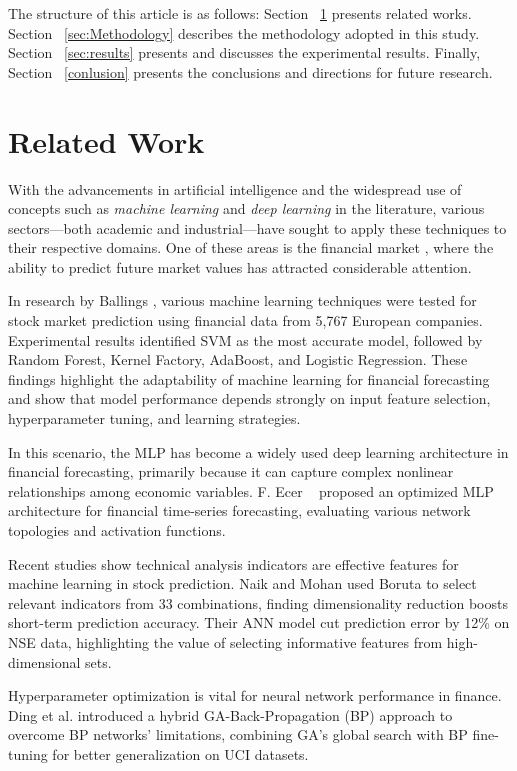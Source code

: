 \documentclass[conference]{IEEEtran}
\begin{document}
The structure of this article is as follows: Section ~\ref{sec:relatedwork} presents related works. Section ~\ref{sec:Methodology} describes the methodology adopted in this study. Section ~\ref{sec:results} presents and discusses the experimental results. Finally, Section ~\ref{conlusion} presents the conclusions and directions for future research.


\section{Related Work}
\label{sec:relatedwork}
With the advancements in artificial intelligence and the widespread use of concepts such as \textit{machine learning} and \textit{deep learning} in the literature, various sectors—both academic and industrial—have sought to apply these techniques to their respective domains. One of these areas is the financial market \cite{heaton2017deep}, where the ability to predict future market values has attracted considerable attention.

In research by Ballings \cite{ballings2015evaluating}, various machine learning techniques were tested for stock market prediction using financial data from 5,767 European companies. Experimental results identified SVM as the most accurate model, followed by Random Forest, Kernel Factory, AdaBoost, and Logistic Regression. These findings highlight the adaptability of machine learning for financial forecasting and show that model performance depends strongly on input feature selection, hyperparameter tuning, and learning strategies.

In this scenario, the MLP has become a widely used deep learning architecture in financial forecasting, primarily because it can capture complex nonlinear relationships among economic variables. F. Ecer ~\cite{ecer2020training} proposed an optimized MLP architecture for financial time-series forecasting, evaluating various network topologies and activation functions.


Recent studies show technical analysis indicators are effective features for machine learning in stock prediction. Naik and Mohan 
\cite{naik2019optimal} used Boruta to select relevant indicators from 33 combinations, finding dimensionality reduction boosts short-term prediction accuracy. Their ANN model cut prediction error by 12\% on NSE data, highlighting the value of selecting informative features from high-dimensional sets.

Hyperparameter optimization is vital for neural network performance in finance. Ding et al. \cite{ding2011optimizing} introduced a hybrid GA-Back-Propagation (BP) approach to overcome BP networks' limitations, combining GA's global search with BP fine-tuning for better generalization on UCI datasets.
\end{document}
